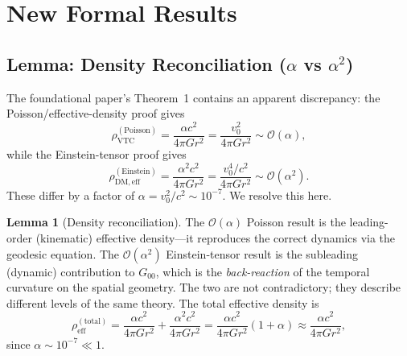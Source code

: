 \documentclass[11pt,a4paper]{article}
\theoremstyle{definition}
\newtheorem{lemma}[theorem]{Lemma}
\newcommand{\eff}{\mathrm{eff}}
\newcommand{\DM}{\mathrm{DM}}
\newcommand{\VTC}{\mathrm{VTC}}
\begin{document}
\section{New Formal Results}
\label{sec:new_results}

\subsection{Lemma: Density Reconciliation ($\alpha$ vs $\alpha^2$)}
\label{lem:density_reconciliation}

The foundational paper's Theorem~1 contains an apparent discrepancy: the Poisson/effective-density proof gives
\begin{equation}
\rho_{\VTC}^{\mathrm{(Poisson)}} = \frac{\alpha c^2}{4\pi G r^2} = \frac{v_0^2}{4\pi G r^2} \sim \mathcal{O}(\alpha),
\end{equation}
while the Einstein-tensor proof gives
\begin{equation}
\rho_{\DM,\eff}^{(\mathrm{Einstein})} = \frac{\alpha^2 c^2}{4\pi G r^2} = \frac{v_0^4/c^2}{4\pi G r^2} \sim \mathcal{O}(\alpha^2).
\end{equation}
These differ by a factor of $\alpha = v_0^2/c^2 \sim 10^{-7}$. We resolve this here.

\begin{lemma}[Density reconciliation]
The $\mathcal{O}(\alpha)$ Poisson result is the leading-order (kinematic) effective density---it reproduces the correct dynamics via the geodesic equation. The $\mathcal{O}(\alpha^2)$ Einstein-tensor result is the subleading (dynamic) contribution to $G_{00}$, which is the \textit{back-reaction} of the temporal curvature on the spatial geometry. The two are not contradictory; they describe different levels of the same theory. The total effective density is
\begin{equation}
\rho_{\eff}^{\mathrm{(total)}} = \frac{\alpha c^2}{4\pi G r^2} + \frac{\alpha^2 c^2}{4\pi G r^2} = \frac{\alpha c^2}{4\pi G r^2}\left(1 + \alpha\right) \approx \frac{\alpha c^2}{4\pi G r^2},
\end{equation}
since $\alpha \sim 10^{-7} \ll 1$.
\end{lemma}
\end{document}
